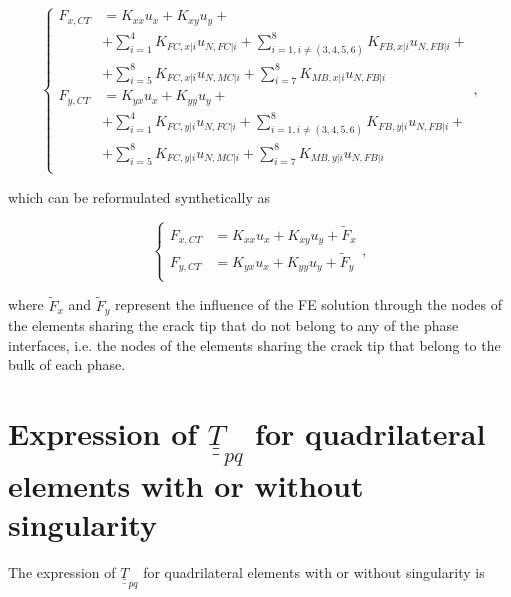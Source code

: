 \documentclass[review]{elsarticle}
\begin{document}
\begin{equation}
\begin{cases}
F_{x,CT}&= K_{xx}u_{x}+K_{xy}u_{y}+\\
&+\sum_{i=1}^{4}K_{FC,x|i}u_{N,FC|i}+\sum_{i=1,i\neq\left(3,4,5,6\right)}^{8}K_{FB,x|i}u_{N,FB|i}+\\
&+\sum_{i=5}^{8}K_{FC,x|i}u_{N,MC|i}+\sum_{i=7}^{8}K_{MB,x|i}u_{N,FB|i}\\
F_{y,CT}&= K_{yx}u_{x}+K_{yy}u_{y}+\\
&+\sum_{i=1}^{4}K_{FC,y|i}u_{N,FC|i}+\sum_{i=1,i\neq\left(3,4,5,6\right)}^{8}K_{FB,y|i}u_{N,FB|i}+\\
&+\sum_{i=5}^{8}K_{FC,y|i}u_{N,MC|i}+\sum_{i=7}^{8}K_{MB,y|i}u_{N,FB|i}\\
\end{cases},
\end{equation}

which can be reformulated synthetically as

\begin{equation}
\begin{cases}
F_{x,CT}&= K_{xx}u_{x}+K_{xy}u_{y}+\widetilde{F}_{x}\\
F_{y,CT}&= K_{yx}u_{x}+K_{yy}u_{y}+\widetilde{F}_{y}\\
\end{cases}, 
\end{equation}

where $\widetilde{F}_{x}$ and $\widetilde{F}_{y}$ represent the influence of the FE solution through the nodes of the elements sharing the crack tip that do not belong to any of the phase interfaces, i.e. the nodes of the elements sharing the crack tip that belong to the bulk of each phase.

\section{Expression of $\underline{\underline{T}}_{pq}$ for quadrilateral elements with or without singularity}\label{app:Tpq}

The expression of $\underline{\underline{T}}_{pq}$ for quadrilateral elements with or without singularity is
\end{document}
